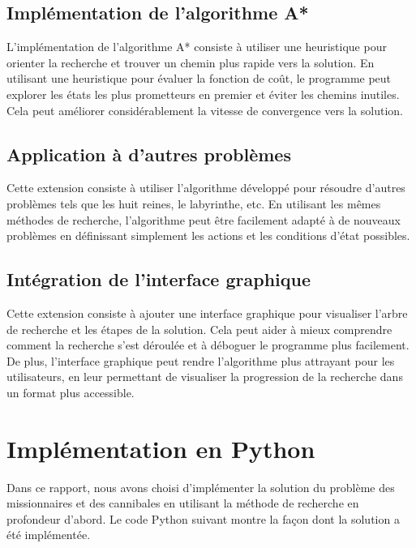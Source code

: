 \documentclass{article}
\begin{document}
\subsection{Implémentation de l'algorithme A*}
 
L'implémentation de l'algorithme A* consiste à utiliser une heuristique pour orienter la recherche et trouver un chemin plus rapide vers la solution. En utilisant une heuristique pour évaluer la fonction de coût, le programme peut explorer les états les plus prometteurs en premier et éviter les chemins inutiles. Cela peut améliorer considérablement la vitesse de convergence vers la solution.

\subsection{Application à d'autres problèmes}

Cette extension consiste à utiliser l'algorithme développé pour résoudre d'autres problèmes tels que les huit reines, le labyrinthe, etc. En utilisant les mêmes méthodes de recherche, l'algorithme peut être facilement adapté à de nouveaux problèmes en définissant simplement les actions et les conditions d'état possibles.

\subsection{Intégration de l'interface graphique}

Cette extension consiste à ajouter une interface graphique pour visualiser l'arbre de recherche et les étapes de la solution. Cela peut aider à mieux comprendre comment la recherche s'est déroulée et à déboguer le programme plus facilement. De plus, l'interface graphique peut rendre l'algorithme plus attrayant pour les utilisateurs, en leur permettant de visualiser la progression de la recherche dans un format plus accessible.


\section{Implémentation en Python}

Dans ce rapport, nous avons choisi d'implémenter la solution du problème des missionnaires et des cannibales en utilisant la méthode de recherche en profondeur d'abord. Le code Python suivant montre la façon dont la solution a été implémentée.
\end{document}
